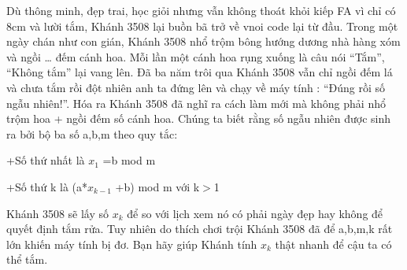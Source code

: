 Dù thông minh, đẹp trai, học giỏi nhưng vẫn không thoát khỏi kiếp FA vì chỉ có 8cm và lười tắm, Khánh 3508 lại buồn bã trở về vnoi code lại từ đầu. Trong một ngày chán như con gián, Khánh 3508 nhổ trộm bông hướng dương nhà hàng xóm và ngồi … đếm cánh hoa. Mỗi lần một cánh hoa rụng xuống là câu nói “Tắm”, “Không tắm” lại vang lên. Đã ba năm trôi qua Khánh 3508 vẫn chỉ ngồi đếm lá và chưa tắm rồi đột nhiên anh ta đứng lên và chạy về máy tính : “Đúng rồi số ngẫu nhiên!”. Hóa ra Khánh 3508 đã nghĩ ra cách làm mới mà không phải nhổ trộm hoa + ngồi đếm số cánh hoa. Chúng ta biết rằng số ngẫu nhiên được sinh ra bởi bộ ba số a,b,m theo quy tắc:  

   +Số thứ nhất là $x_{1}$   =b mod m  

   +Số thứ k là (a*$x_{k-1}$   +b) mod m với k$>$1  

   Khánh 3508 sẽ lấy số $x_{k}$   để so với lịch xem nó có phải ngày đẹp hay không để quyết định tắm rửa. Tuy nhiên do thích chơi trội Khánh 3508 đã để a,b,m,k rất lớn khiến máy tính bị đơ. Bạn hãy giúp Khánh tính $x_{k}$   thật nhanh để cậu ta có thể tắm.